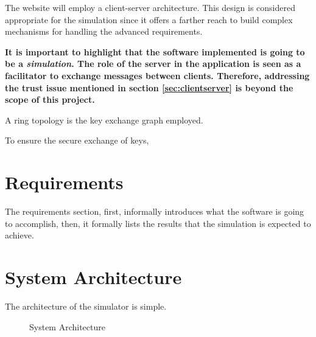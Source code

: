 The website will employ a client-server architecture. This design is considered appropriate for the simulation since it offers a farther reach to build complex mechanisms for handling the advanced requirements.

\textbf{It is important to highlight that the software implemented is going to be a \emph{simulation}. The role of the server in the application is seen as a facilitator to exchange messages between clients. Therefore, addressing the trust issue mentioned in section \ref{sec:clientserver} is beyond the scope of this project.}

A ring topology is the key exchange graph employed.


To ensure the secure exchange of keys, 


\section{Requirements} \label{sec:requirements}
The requirements section, first, informally introduces what the software is going to accomplish, then, it formally lists the results that the simulation is expected to achieve.


\section{System Architecture}
The architecture of the simulator is simple.  

\begin{figure}[H]
    \centering
    \caption{System Architecture}
    \label{fig:systemArchitecture}
\end{figure}


